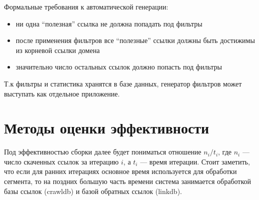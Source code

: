 Формальные требования к автоматической генерации:
\begin{itemize}
 \item ни одна ``полезная'' ссылка  не должна попадать под фильтры
 \item после применения фильтров все ``полезные'' ссылки должны быть достижимы из корневой ссылки домена
 \item значительно число остальных ссылок должно попасть под фильтры
\end{itemize}

Т.к фильтры и статистика хранятся в базе данных, генератор фильтров может выступать как отдельное приложение.
\section*{Методы оценки эффективности}
Под эффективностью сборки далее будет пониматься отношение $n_{i}/t_{i}$, где $n_{i}$ --- число скаченных ссылок за итерацию $i$, а $t_{i}$ --- время итерации. Стоит заметить, что если для ранних итерациях основное время используется для обработки сегмента, то на поздних большую часть времени система занимается обработкой базы ссылок (crawldb) и базой обратных ссылок (linkdb).